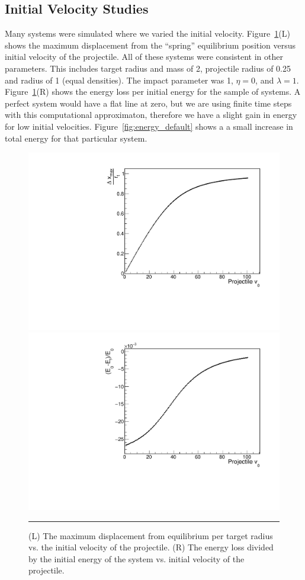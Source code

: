 \documentclass[aps,prl,floatfix,preprint,nofootinbib]{revtex4}
\begin{document}
\subsection{Initial Velocity Studies}
Many systems were simulated where we varied the initial velocity. Figure~\ref{fig:changing_pvinit1}(L) shows the maximum displacement from the ``spring'' equilibrium position versus initial velocity of the projectile. All of these systems were consistent in other parameters. This includes target radius and mass of 2, projectile radius of 0.25 and radius of 1 (equal densities). The impact parameter was 1, $\eta = 0$, and $\lambda = 1$. Figure~\ref{fig:changing_pvinit1}(R) shows the energy loss per initial energy for the sample of systems. A perfect system would have a flat line at zero, but we are using finite time steps with this computational approximaton, therefore we have a slight gain in energy for low initial velocities. Figure~\ref{fig:energy_default} shows a a small increase in total energy for that particular system.
\begin{figure}[h!]
  \includegraphics[width=.45\linewidth]{plots/trend_plots/dxmax_vs_pvinit.pdf}
  \includegraphics[width=.45\linewidth]{plots/trend_plots/Eloss_vs_pvinit.pdf}
                  {\par\nobreak\rule[9pt]{35em}{0.5pt}\vspace{-5mm}}
                  \caption{(L) The maximum displacement from equilibrium per target radius vs. the initial velocity of the projectile. (R) The energy loss divided by the initial energy of the system vs. initial velocity of the projectile.}
                  \label{fig:changing_pvinit1}
\end{figure}
\end{document}
